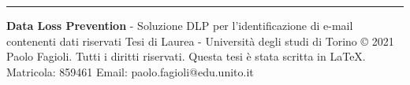 
    \vspace*{\fill}
    \noindent\rule{\textwidth}{0.4pt}
    \thispagestyle{empty}
    \textbf{Data Loss Prevention} - Soluzione DLP per l'identificazione di e-mail contenenti dati riservati
    \newline
    \newline
    Tesi di Laurea - Università degli studi di Torino
    \newline
    © 2021 Paolo Fagioli. Tutti i diritti riservati.
    \newline
    \newline
    Questa tesi è stata scritta in \LaTeX.
    \newline
    \newline
    Matricola: 859461
    \newline
    \newline
    Email: paolo.fagioli@edu.unito.it
\pagebreak